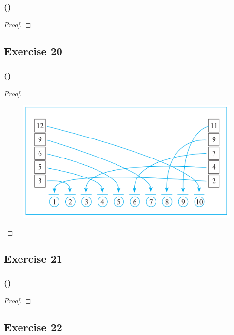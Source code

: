 \documentclass[14pt]{extarticle}
\begin{document}
\subsubsection{()}

\begin{proof}

\end{proof}

\subsection{Exercise 20}

\subsubsection{()}

\begin{proof}
\begin{figure}[ht!]
\centering
\includegraphics[scale=0.5]{../images/11.5.20.png}
\end{figure}
\end{proof}

\subsection{Exercise 21}

\subsubsection{()}

\begin{proof}

\end{proof}

\subsection{Exercise 22}
\end{document}
